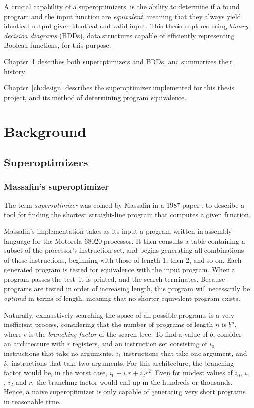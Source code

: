 \documentclass[a4paper,11pt]{kth-mag}
\begin{document}
A crucial capability of a superoptimizers, is the ability to determine if a found program and the input function are \emph{equivalent}, meaning that they always yield identical output given identical and valid input.
This thesis explores using \emph{binary decision diagrams} (BDDs), data structures capable of efficiently representing Boolean functions, for this purpose.

Chapter~\ref{ch:background} describes both superoptimizers and BDDs, and summarizes their history.

Chapter~\ref{ch:design} describes the superoptimizer implemented for this thesis project, and its method of determining program equivalence.

\chapter{Background}
\label{ch:background}

\section{Superoptimizers}

\subsection{Massalin's superoptimizer}

The term \emph{superoptimizer} was coined by Massalin in a 1987 paper \cite{massalin87}, to describe a tool for finding the shortest straight-line program that computes a given function.

Massalin's implementation takes as its input a program written in assembly language for the Motorola 68020 processor.
It then consults a table containing a subset of the processor's instruction set, and begins generating all combinations of these instructions, beginning with those of length 1, then 2, and so on.
Each generated program is tested for equivalence with the input program.
When a program passes the test, it is printed, and the search terminates.
Because programs are tested in order of increasing length, this program will necessarily be \emph{optimal} in terms of length, meaning that no shorter equivalent program exists.

Naturally, exhaustively searching the space of all possible programs is a very inefficient process, considering that the number of programs of length $n$ is $b^n$, where $b$ is the \emph{branching factor} of the search tree.
To find a value of $b$, consider an architecture with $r$ registers, and an instruction set consisting of $i_0$ instructions that take no arguments, $i_1$ instructions that take one argument, and $i_2$ instructions that take two arguments.
For this architecture, the branching factor would be, in the worst case, $i_0+i_1r+i_2r^2$.
Even for modest values of $i_0$, $i_1$, $i_2$ and $r$, the branching factor would end up in the hundreds or thousands.
Hence, a naive superoptimizer is only capable of generating very short programs in reasonable time.
\end{document}
